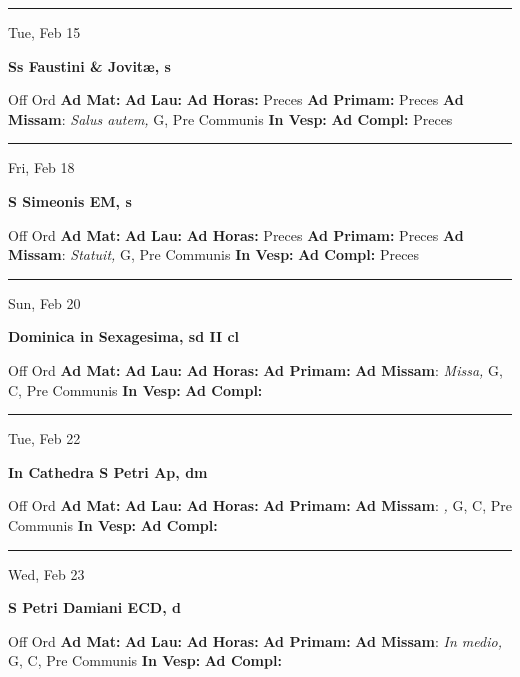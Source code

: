 \documentclass[letterpaper, 10pt]{article}
\begin{document}
\hrule
\begin{center}
Tue, Feb 15
\end{center}\textbf{ \large Ss Faustini \& Jovitæ, \textnormal{\normalsize s}}
\begin{justify}
Off Ord
\textbf{Ad Mat: }
\textbf{Ad Lau: }
\textbf{Ad Horas: }Preces
\textbf{Ad Primam: }Preces
\textbf{Ad Missam}: \textit{Salus autem,} G, Pre Communis
\textbf{In Vesp: }
\textbf{Ad Compl: }Preces\end{justify}



\hrule
\begin{center}
Fri, Feb 18
\end{center}\textbf{ \large S Simeonis EM, \textnormal{\normalsize s}}
\begin{justify}
Off Ord
\textbf{Ad Mat: }
\textbf{Ad Lau: }
\textbf{Ad Horas: }Preces
\textbf{Ad Primam: }Preces
\textbf{Ad Missam}: \textit{Statuit,} G, Pre Communis
\textbf{In Vesp: }
\textbf{Ad Compl: }Preces\end{justify}



\hrule
\begin{center}
Sun, Feb 20
\end{center}\textbf{ \large Dominica in Sexagesima, \textnormal{\normalsize sd II cl}}
\begin{justify}
Off Ord
\textbf{Ad Mat: }
\textbf{Ad Lau: }
\textbf{Ad Horas: }
\textbf{Ad Primam: }
\textbf{Ad Missam}: \textit{Missa,} G, C, Pre Communis
\textbf{In Vesp: }
\textbf{Ad Compl: }\end{justify}



\hrule
\begin{center}
Tue, Feb 22
\end{center}\textbf{ \large In Cathedra S Petri Ap, \textnormal{\normalsize dm}}
\begin{justify}
Off Ord
\textbf{Ad Mat: }
\textbf{Ad Lau: }
\textbf{Ad Horas: }
\textbf{Ad Primam: }
\textbf{Ad Missam}: \textit{,} G, C, Pre Communis
\textbf{In Vesp: }
\textbf{Ad Compl: }\end{justify}



\hrule
\begin{center}
Wed, Feb 23
\end{center}\textbf{ \large S Petri Damiani ECD, \textnormal{\normalsize d}}
\begin{justify}
Off Ord
\textbf{Ad Mat: }
\textbf{Ad Lau: }
\textbf{Ad Horas: }
\textbf{Ad Primam: }
\textbf{Ad Missam}: \textit{In medio,} G, C, Pre Communis
\textbf{In Vesp: }
\textbf{Ad Compl: }\end{justify}
\end{document}
